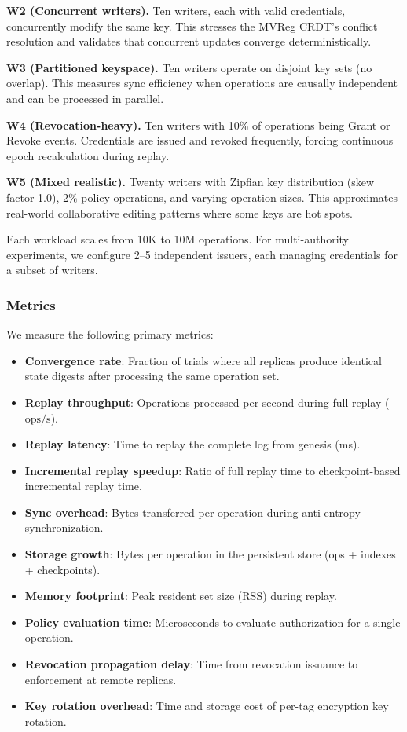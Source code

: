 \noindent\textbf{W2 (Concurrent writers).} Ten writers, each with valid credentials, concurrently modify the same key. This stresses the MVReg CRDT's conflict resolution and validates that concurrent updates converge deterministically.

\noindent\textbf{W3 (Partitioned keyspace).} Ten writers operate on disjoint key sets (no overlap). This measures sync efficiency when operations are causally independent and can be processed in parallel.

\noindent\textbf{W4 (Revocation-heavy).} Ten writers with 10\% of operations being Grant or Revoke events. Credentials are issued and revoked frequently, forcing continuous epoch recalculation during replay.

\noindent\textbf{W5 (Mixed realistic).} Twenty writers with Zipfian key distribution (skew factor 1.0), 2\% policy operations, and varying operation sizes. This approximates real-world collaborative editing patterns where some keys are hot spots.

Each workload scales from 10K to 10M operations. For multi-authority experiments, we configure 2--5 independent issuers, each managing credentials for a subset of writers.

\subsubsection{Metrics}
We measure the following primary metrics:

\begin{itemize}[leftmargin=1.5em]
    \item \textbf{Convergence rate}: Fraction of trials where all replicas produce identical state digests after processing the same operation set.
    \item \textbf{Replay throughput}: Operations processed per second during full replay ($\text{ops}/\text{s}$).
    \item \textbf{Replay latency}: Time to replay the complete log from genesis (ms).
    \item \textbf{Incremental replay speedup}: Ratio of full replay time to checkpoint-based incremental replay time.
    \item \textbf{Sync overhead}: Bytes transferred per operation during anti-entropy synchronization.
    \item \textbf{Storage growth}: Bytes per operation in the persistent store (ops + indexes + checkpoints).
    \item \textbf{Memory footprint}: Peak resident set size (RSS) during replay.
    \item \textbf{Policy evaluation time}: Microseconds to evaluate authorization for a single operation.
    \item \textbf{Revocation propagation delay}: Time from revocation issuance to enforcement at remote replicas.
    \item \textbf{Key rotation overhead}: Time and storage cost of per-tag encryption key rotation.
\end{itemize}

